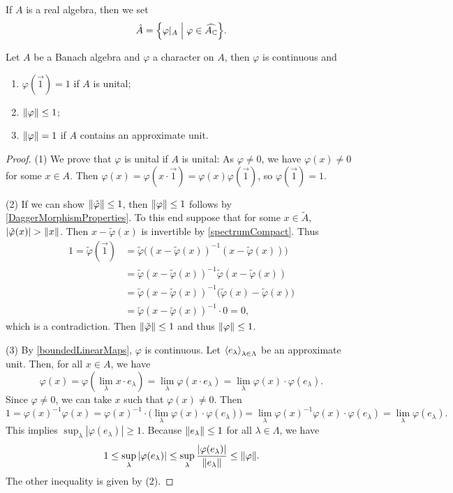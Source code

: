 If $A$ is a real algebra, then we set
\[ \hat{A} = \setbuilder{\varphi|_A}{\varphi\in \widehat{A_\C}}. \]

\begin{proposition} \label{charactersUnital}
Let $A$ be a Banach algebra and $\varphi$ a character on $A$, then $\varphi$ is continuous and
\begin{enumerate}
\item $\varphi(\vec{1}) = 1$ if $A$ is unital;
\item $\lVert\varphi\rVert\leq 1$;
\item $\lVert\varphi\rVert = 1$ if $A$ contains an approximate unit.
\end{enumerate}
\end{proposition}
\begin{proof}
(1) We prove that $\varphi$ is unital if $A$ is unital: As $\varphi \neq 0$, we have $\varphi(x)\neq 0$ for some $x\in A$. Then $\varphi(x) = \varphi(x\cdot\vec{1}) = \varphi(x)\varphi(\vec{1})$, so $\varphi(\vec{1}) = 1$.

(2) If we can show $\lVert\tilde{\varphi}\rVert \leq 1$, then $\lVert\varphi\rVert\leq 1$ follows by \ref{DaggerMorphismProperties}. To this end suppose that for some $x\in \tilde{A}$, $|\tilde{\varphi}(x)|>\norm{x}$. Then $x-\tilde{\varphi}(x)$ is invertible by \ref{spectrumCompact}. Thus
\begin{align*}
1 = \tilde{\varphi}(\vec{1}) &= \tilde{\varphi}\big((x-\tilde{\varphi}(x))^{-1}(x-\tilde{\varphi}(x))\big) \\
&= \tilde{\varphi}(x-\tilde{\varphi}(x))^{-1}\tilde{\varphi}(x-\tilde{\varphi}(x)) \\
&= \tilde{\varphi}(x-\tilde{\varphi}(x))^{-1}\big(\tilde{\varphi}(x)-\tilde{\varphi}(x)\big) \\
&= \tilde{\varphi}(x-\tilde{\varphi}(x))^{-1}\cdot 0 = 0,
\end{align*}
which is a contradiction. Then $\lVert\tilde{\varphi}\rVert \leq 1$ and thus $\lVert\varphi\rVert \leq 1$.

(3) By \ref{boundedLinearMaps}, $\varphi$ is continuous. Let $\left\langle e_\lambda \right\rangle_{\lambda\in\Lambda}$ be an approximate unit.
Then, for all $x\in A$, we have
\[ \varphi(x) = \varphi(\lim_\lambda x\cdot e_\lambda) = \lim_\lambda\varphi(x\cdot e_\lambda) = \lim_\lambda \varphi(x)\cdot \varphi(e_\lambda). \]
Since $\varphi\neq 0$, we can take $x$ such that $\varphi(x)\neq 0$. Then
\[ 1 = \varphi(x)^{-1}\varphi(x) = \varphi(x)^{-1}\cdot\big(\lim_\lambda \varphi(x)\cdot \varphi(e_\lambda)\big) = \lim_\lambda \varphi(x)^{-1}\varphi(x)\cdot \varphi(e_\lambda) = \lim_\lambda \varphi(e_\lambda). \]
This implies $\sup_{\lambda}|\varphi(e_\lambda)| \geq 1$. Because $\lVert e_\lambda\rVert\leq 1$ for all $\lambda\in\Lambda$, we have
\[ 1 \leq \sup_{\lambda}|\varphi(e_\lambda)| \leq \sup_{\lambda}\frac{|\varphi(e_\lambda)|}{\lVert e_\lambda\rVert} \leq \lVert\varphi\rVert. \]
The other inequality is given by (2).
\end{proof}


